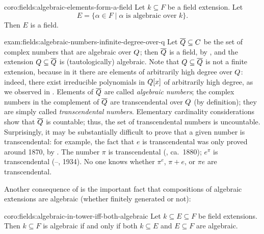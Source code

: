 \begin{coro}{}{coro:fields:algebraic-elements-form-a-field}
  Let $k \subseteq F$ be a field extension. Let
  \[
    E = \{\alpha \in F \mid \alpha \text{ is algebraic over } k\}.
  \]
  Then $E$ is a field.
\end{coro}
\begin{exam}{}{exam:fields:algebraic-numbers-infinite-degree-over-q}
  Let $\overline{Q} \subseteq C$ be the set of complex numbers that
  are algebraic over $Q$; then $\overline{Q}$ is a field, by
  , and the extension
  $Q \subseteq \overline{Q}$ is (tautologically) algebraic. Note
  that $Q \subseteq \overline{Q}$ is not a finite extension, because
  in it there are elements of arbitrarily high degree over $Q$:
  indeed, there exist irreducible polynomials in $Q[x]$ of
  arbitrarily high degree, as we observed in .
  Elements of $\overline{Q}$ are called \emph{algebraic numbers}; the
  complex numbers in the complement of $\overline{Q}$ are
  transcendental over $Q$ (by definition); they are simply called
  \emph{transcendental numbers}. Elementary cardinality considerations
  show that $\overline{Q}$ is countable; thus, the set of
  transcendental numbers is uncountable. Surprisingly, it may be
  substantially difficult to prove that a given number is
  transcendental: for example, the fact that $e$ is transcendental was
  only proved around 1870, by . The number $\pi$
  is transcendental (, ca.\ 1880); $e^\pi$ is
  transcendental (--, 1934). No one
  knows whether $\pi^e$, $\pi + e$, or $\pi e$ are transcendental.
\end{exam}
Another consequence of  is the important fact
that compositions of algebraic extensions are algebraic (whether
finitely generated or not):
\begin{coro}{}{coro:fields:algebraic-in-tower-iff-both-algebraic}
  Let $k \subseteq E \subseteq F$ be field extensions. Then
  $k \subseteq F$ is algebraic if and only if both $k \subseteq E$ and
  $E \subseteq F$ are algebraic.
\end{coro}
